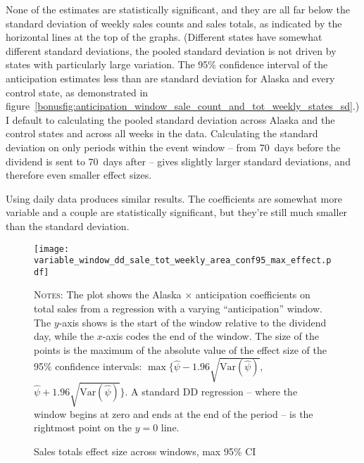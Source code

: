 \documentclass[11pt,letterpaper,oneside]{article}
\newcommand{\Var}{\text{Var}}
\begin{document}
None of the estimates are statistically significant, and they are all far below the standard deviation of weekly sales counts and sales totals, as indicated by the horizontal lines at the top of the graphs.
(Different states have somewhat different standard deviations, the pooled standard deviation is not driven by states with particularly large variation.
The 95\% confidence interval of the anticipation estimates less than are standard deviation for Alaska and every control state, as demonstrated in figure~\ref{bonusfig:anticipation_window_sale_count_and_tot_weekly_states_sd}.)
I default to calculating the pooled standard deviation across Alaska and the control states and across all weeks in the data.
Calculating the standard deviation on only periods within the event window -- from 70~days before the dividend is sent to 70~days after -- gives slightly larger standard deviations, and therefore even smaller effect sizes.

Using daily data produces similar results.
The coefficients are somewhat more variable and a couple are statistically significant, but they're still much smaller than the standard deviation.


\begin{figure}[hbt]
     \caption{Sales totals effect size across windows, max 95\% CI}
     \label{fig:variable_window_sale_tot_conf95_max_effect}
        \texttt{[image: variable\_window\_dd\_sale\_tot\_weekly\_area\_conf95\_max\_effect.pdf]}

    {\footnotesize
    \textsc{Notes:} The plot shows the Alaska $\times$ anticipation coefficients on total sales from a regression with a varying ``anticipation'' window.
    The $y$-axis shows is the start of the window relative to the dividend day, while the $x$-axis codes the end of the window.
    The size of the points is the maximum of the absolute value of the effect size of the 95\% confidence intervals: $\max \big\{ \hat{\psi} - 1.96 \sqrt{\Var(\hat{\psi})},$ $ \hat{\psi} + 1.96 \sqrt{\Var(\hat{\psi})} \big\}$.
    A standard DD regression -- where the window begins at zero and ends at the end of the period -- is the rightmost point on the $y=0$ line.
    }
\end{figure}
\end{document}
